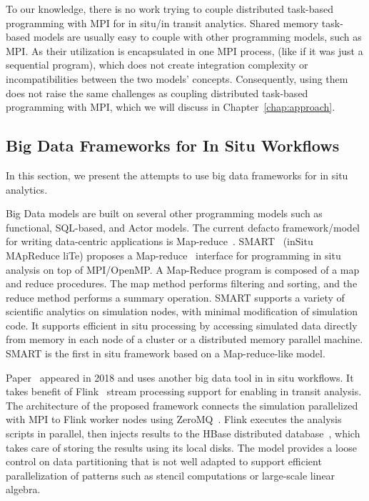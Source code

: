 To our knowledge, there is no work trying to couple distributed task-based programming with MPI for in situ/in transit analytics.
Shared memory task-based models are usually easy to couple with other programming models, such as MPI. 
As their utilization is encapsulated in one MPI process, (like if it was just a sequential program), which does not create integration complexity or incompatibilities between the two models' concepts.  
Consequently, using them does not raise the same challenges as coupling distributed task-based programming with MPI, which we will discuss in Chapter~\ref{chap:approach}.


\subsection{Big Data Frameworks for In Situ Workflows}\label{sec:insitu:bigdata}

In this section, we present the attempts to use big data frameworks for in situ analytics.  

Big Data models are built on several other programming models such as functional, SQL-based, and Actor models. The current defacto framework/model for writing data-centric applications is Map-reduce~\cite{Wu2017}.
SMART~\cite{wang_smart_2015} (inSitu MApReduce liTe) proposes a Map-reduce~\cite{dean2008mapreduce} interface for programming in situ analysis on top of MPI/OpenMP. 
A Map-Reduce program is composed of a map and reduce procedures. The map method performs filtering and sorting, and the reduce method performs a summary operation. 
SMART supports a variety of scientific analytics on simulation nodes, with minimal modification of simulation code. It supports efficient in situ processing by accessing simulated data directly from memory in each node of a cluster or a distributed memory parallel machine. SMART is the first in situ framework based on a Map-reduce-like model.


Paper~\cite{zanuz_-transit_2018_flink} appeared in 2018 and uses another big data tool in in situ workflows. It takes benefit of Flink~\cite{carbone2015apache_flink, friedman2016introduction_flink} stream processing support for enabling in transit analysis.
The architecture of the proposed framework connects the 
simulation parallelized with MPI to Flink worker nodes using ZeroMQ~\cite{hintjens2013zeromq}. Flink executes the analysis scripts in parallel, then injects results to the HBase distributed database~\cite{vora2011hadoop}, which takes care of storing the results using its local disks. 
The model provides a loose control on data partitioning that is not well adapted to support efficient parallelization of patterns such as stencil computations\cite{arrayUDF-SC2018} or large-scale linear algebra.

